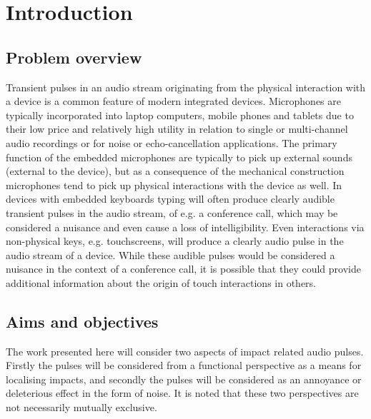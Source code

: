 \chapter{Introduction}\label{ch:Introduction}
\ifpdf
    \graphicspath{{Introduction/IntroductionFigs/PNG/}{Introduction/IntroductionFigs/PDF/}{Introduction/IntroductionFigs/}}
\else
    \graphicspath{{Introduction/IntroductionFigs/EPS/}{Introduction/IntroductionFigs/}}
\fi

\section{Problem overview}
Transient pulses in an audio stream originating from the physical interaction with a device is a common feature of modern integrated devices. Microphones are typically incorporated into laptop computers, mobile phones and tablets due to their low price and relatively high utility in relation to single or multi-channel audio recordings or for noise or echo-cancellation applications. The primary function of the embedded microphones are typically to pick up external sounds (external to the device), but as a consequence of the mechanical construction microphones tend to pick up physical interactions with the device as well. In devices with embedded keyboards typing will often produce clearly audible transient pulses in the audio stream, of e.g. a conference call, which may be considered a nuisance and even cause a loss of intelligibility. Even interactions via non-physical keys, e.g. touchscreens, will produce a clearly audio pulse in the audio stream of a device. While these audible pulses would be considered a nuisance in the context of a conference call, it is possible that they could provide additional information about the origin of touch interactions in others.

\section{Aims and objectives}
The work presented here will consider two aspects of impact related audio pulses. Firstly the pulses will be considered from a functional perspective as a means for localising impacts, and secondly the pulses will be considered as an annoyance or deleterious effect in the form of noise. It is noted that these two perspectives are not necessarily mutually exclusive.

